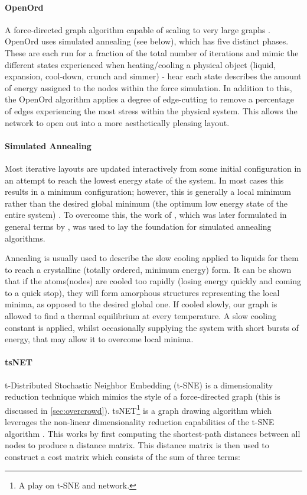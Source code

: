 \paragraph{OpenOrd}
A force-directed graph algorithm capable of scaling to very large graphs \citep{openord}. OpenOrd uses simulated annealing (see below), which has five distinct phases. These are each run for a fraction of the total number of iterations and mimic the different states experienced when heating/cooling a physical object (liquid, expansion, cool-down, crunch and simmer) - hear each state describes the amount of energy assigned to the nodes within the force simulation. In addition to this, the OpenOrd algorithm applies a degree of edge-cutting to remove a percentage of edges experiencing the most stress within the physical system. This allows the network to open out into a more aesthetically pleasing layout. 


\paragraph*{Simulated Annealing}
Most iterative layouts are updated interactively from some initial configuration in an attempt to reach the lowest energy state of the system. In most cases this results in a minimum configuration; however, this is generally a local minimum rather than the desired global minimum (the optimum low energy state of the entire system) \citep{nicelyanneal}. To overcome this, the work of \cite{metropolis}, which was later formulated in general terms by \citep{kirkpatrick}, was used to lay the foundation for simulated annealing algorithms.

Annealing is usually used to describe the slow cooling applied to liquids for them to reach a crystalline (totally ordered, minimum energy) form. It can be shown that if the atoms(nodes) are cooled too rapidly (losing energy quickly and coming to a quick stop), they will form amorphous structures representing the local minima, as opposed to the desired global one.  If cooled slowly, our graph is allowed to find a thermal equilibrium at every temperature. A slow cooling constant is applied, whilst occasionally supplying the system with short bursts of energy, that may allow it to overcome local minima. 


\paragraph{tsNET}
t-Distributed Stochastic Neighbor Embedding (t-SNE) is a dimensionality reduction technique which mimics the style of a force-directed graph (this is discussed in \autoref{sec:overcrowd}). tsNET\footnote{A play on t-SNE and network.} is a graph drawing algorithm which leverages the non-linear dimensionality reduction capabilities of the t-SNE algorithm \citep{tsne}. This works by first computing the shortest-path distances between all nodes to produce a distance matrix. This distance matrix is then used to construct a cost matrix which consists of the sum of three terms:

